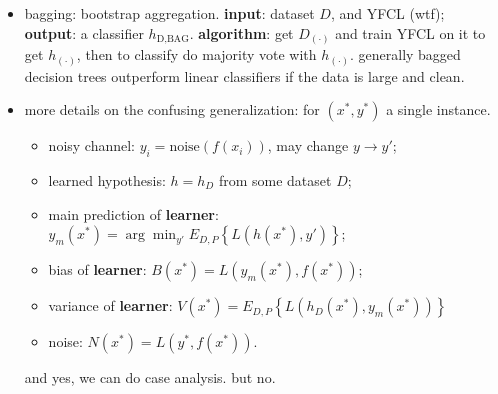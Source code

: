\documentclass{article}
\begin{document}
\begin{itemize}
		{\bf input}: dataset $D$, {\bf output}: variants: $D_1$, $D_2$, \dots, $D_T$. \\
		{\bf algorithm}: for each $D_{(\cdot)}$, pick $|D|$ instances uniformly from $D$. \\
		then, train on $D_{(\cdot)}$ and test on remaining data to get $h_1(x),h_2(x)$,... \\
		variance = ordinary variance of $h_{(\cdot)}(x)$, bias = $\bar h_{(\cdot)}(x)-y$.
	\item bagging: bootstrap aggregation. {\bf input}: dataset $D$, and YFCL (wtf); \\
		{\bf output}: a classifier $h_\text{D,BAG}$. {\bf algorithm}: get $D_{(\cdot)}$ 
		and train YFCL on it to get $h_{(\cdot)}$, then to classify do majority vote with 		
		$h_{(\cdot)}$. generally bagged decision trees outperform linear classifiers 
		if the data is large and clean.
	\item more details on the confusing generalization: for $(x^*,y^*)$ a single instance.
		\begin{itemize}
			\item noisy channel: $y_i=\text{noise}(f(x_i))$, may change $y\rightarrow y'$;
			\item learned hypothesis: $h=h_D$ from some dataset $D$;
			\item main prediction of {\bf learner}: 
				$y_m(x^*)=\arg\min_{y'}E_{D,P}\left\{L(h(x^*),y')\right\}$;
			\item bias of {\bf learner}: $B(x^*)=L(y_m(x^*),f(x^*))$;
			\item variance of {\bf learner}: $V(x^*)=E_{D,P}\left\{L(h_D(x^*),y_m(x^*))\right\}$
			\item noise: $N(x^*)=L(y^*,f(x^*))$.
		\end{itemize}
		and yes, we can do case analysis. but no.
\end{itemize}
\end{document}
